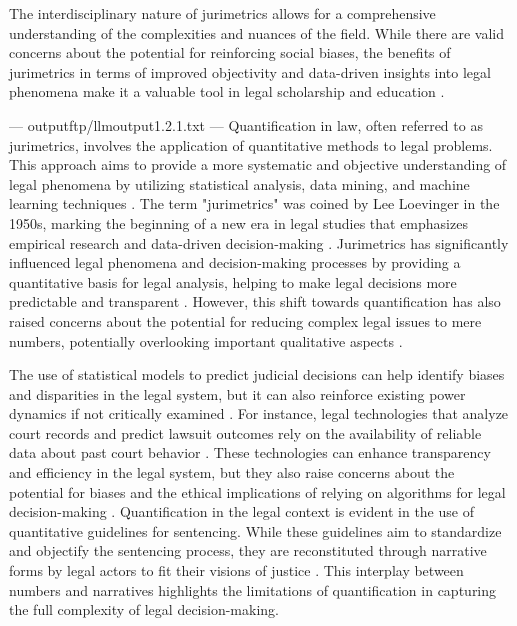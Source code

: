 The interdisciplinary nature of jurimetrics allows for a comprehensive understanding of the complexities and nuances of the field. While there are valid concerns about the potential for reinforcing social biases, the benefits of jurimetrics in terms of improved objectivity and data-driven insights into legal phenomena make it a valuable tool in legal scholarship and education \cite{10.1057/s41599-020-00557-0,10.5040/9781350220645}.


---
outputftp/llmoutput1.2.1.txt
---
Quantification in law, often referred to as jurimetrics, involves the application of quantitative methods to legal problems. This approach aims to provide a more systematic and objective understanding of legal phenomena by utilizing statistical analysis, data mining, and machine learning techniques \cite{1023071190721}. The term "jurimetrics" was coined by Lee Loevinger in the 1950s, marking the beginning of a new era in legal studies that emphasizes empirical research and data-driven decision-making \cite{1023071190721}. Jurimetrics has significantly influenced legal phenomena and decision-making processes by providing a quantitative basis for legal analysis, helping to make legal decisions more predictable and transparent \cite{ribeiro2021quantification}. However, this shift towards quantification has also raised concerns about the potential for reducing complex legal issues to mere numbers, potentially overlooking important qualitative aspects \cite{ribeiro2021quantification}.

The use of statistical models to predict judicial decisions can help identify biases and disparities in the legal system, but it can also reinforce existing power dynamics if not critically examined \cite{101017s0003975609000150}. For instance, legal technologies that analyze court records and predict lawsuit outcomes rely on the availability of reliable data about past court behavior \cite{ribeiro2021quantification}. These technologies can enhance transparency and efficiency in the legal system, but they also raise concerns about the potential for biases and the ethical implications of relying on algorithms for legal decision-making \cite{silva2023role}. Quantification in the legal context is evident in the use of quantitative guidelines for sentencing. While these guidelines aim to standardize and objectify the sentencing process, they are reconstituted through narrative forms by legal actors to fit their visions of justice \cite{101111lsi12334}. This interplay between numbers and narratives highlights the limitations of quantification in capturing the full complexity of legal decision-making.

